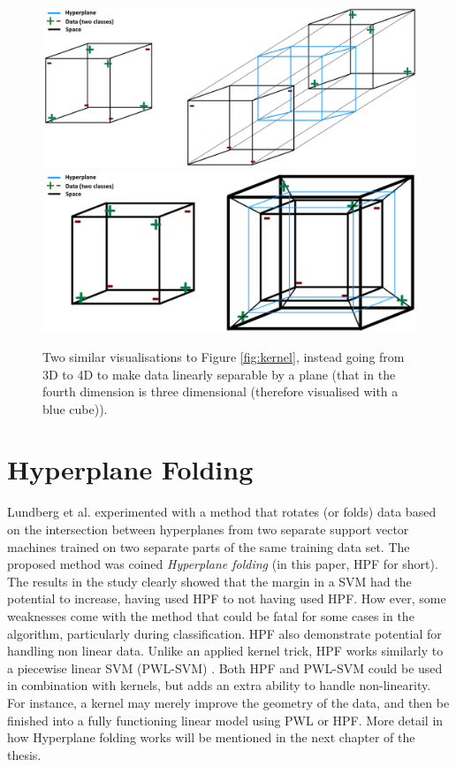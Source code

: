 \documentclass[a4paper,twoside]{bth}
\begin{document}
\begin{figure}
\centering
\includegraphics[scale=0.35]{images/dimred_images/kernel3d4dplane.png}
\includegraphics[scale=0.35]{images/dimred_images/kernel3d4dpottplane3.png}
   \caption{Two similar visualisations to Figure \ref{fig:kernel}, instead going from 3D to 4D to make data linearly separable by a plane (that in the fourth dimension is three dimensional (therefore visualised with a blue cube)). }
   \label{fig:kernel2}
\end{figure}



\section{Hyperplane Folding}
Lundberg et al. \cite{unpublished} experimented with a method that rotates (or folds) data based on the intersection between hyperplanes from two separate support vector machines trained on two separate parts of the same training data set. The proposed method was coined \textit{Hyperplane folding} (in this paper, HPF for short). The results in the study clearly showed that the margin in a SVM had the potential to increase, having used HPF to not having used HPF. How ever, some weaknesses come with the method that could be fatal for some cases in the algorithm, particularly during classification. HPF also demonstrate potential for handling non linear data. Unlike an applied kernel trick, HPF works similarly to a piecewise linear SVM (PWL-SVM) \cite{PWLSVM}. Both HPF and PWL-SVM could be used in combination with kernels, but adds an extra ability to handle non-linearity. For instance, a kernel may merely improve the geometry of the data, and then be finished into a fully functioning linear model using PWL or HPF. More detail in how Hyperplane folding works will be mentioned in the next chapter of the thesis. 
\end{document}
